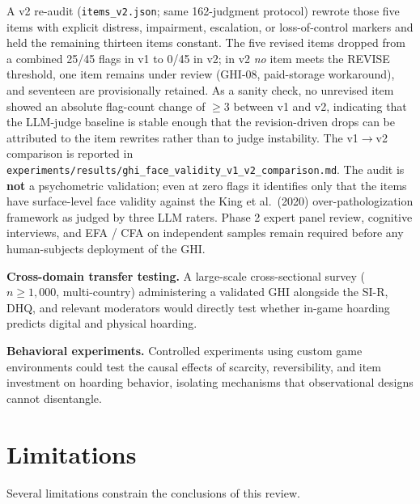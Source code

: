 \documentclass[12pt]{article}
\begin{document}
A v2 re-audit (\texttt{items\_v2.json}; same 162-judgment protocol) rewrote those five items with explicit distress, impairment, escalation, or loss-of-control markers and held the remaining thirteen items constant. The five revised items dropped from a combined 25/45 flags in v1 to 0/45 in v2; in v2 \emph{no} item meets the REVISE threshold, one item remains under review (GHI-08, paid-storage workaround), and seventeen are provisionally retained. As a sanity check, no unrevised item showed an absolute flag-count change of $\geq 3$ between v1 and v2, indicating that the LLM-judge baseline is stable enough that the revision-driven drops can be attributed to the item rewrites rather than to judge instability. The v1$\rightarrow$v2 comparison is reported in \texttt{experiments/results/ghi\_face\_validity\_v1\_v2\_comparison.md}. The audit is \textbf{not} a psychometric validation; even at zero flags it identifies only that the items have surface-level face validity against the King et al.\ (2020) over-pathologization framework as judged by three LLM raters. Phase 2 expert panel review, cognitive interviews, and EFA / CFA on independent samples remain required before any human-subjects deployment of the GHI.

\textbf{Cross-domain transfer testing.} A large-scale cross-sectional survey ($n \geq 1{,}000$, multi-country) administering a validated GHI alongside the SI-R, DHQ, and relevant moderators would directly test whether in-game hoarding predicts digital and physical hoarding.

\textbf{Behavioral experiments.} Controlled experiments using custom game environments could test the causal effects of scarcity, reversibility, and item investment on hoarding behavior, isolating mechanisms that observational designs cannot disentangle.

\section{Limitations}

Several limitations constrain the conclusions of this review.
\end{document}
